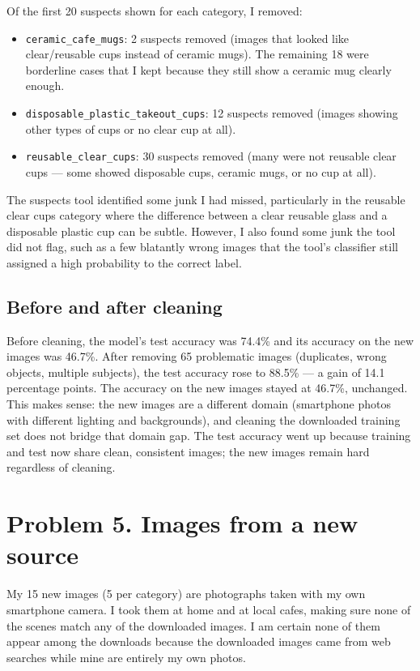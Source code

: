 \documentclass[11pt]{article}
\begin{document}
Of the first 20 suspects shown for each category, I removed:
\begin{itemize}
  \item \texttt{ceramic\_cafe\_mugs}: 2 suspects removed (images that looked like clear/reusable cups instead of ceramic mugs). The remaining 18 were borderline cases that I kept because they still show a ceramic mug clearly enough.
  \item \texttt{disposable\_plastic\_takeout\_cups}: 12 suspects removed (images showing other types of cups or no clear cup at all).
  \item \texttt{reusable\_clear\_cups}: 30 suspects removed (many were not reusable clear cups --- some showed disposable cups, ceramic mugs, or no cup at all).
\end{itemize}

The suspects tool identified some junk I had missed, particularly in the reusable clear cups category where the difference between a clear reusable glass and a disposable plastic cup can be subtle. However, I also found some junk the tool did not flag, such as a few blatantly wrong images that the tool's classifier still assigned a high probability to the correct label.

\subsection*{Before and after cleaning}

Before cleaning, the model's test accuracy was 74.4\% and its accuracy on the new images was 46.7\%. After removing 65 problematic images (duplicates, wrong objects, multiple subjects), the test accuracy rose to 88.5\% --- a gain of 14.1 percentage points. The accuracy on the new images stayed at 46.7\%, unchanged. This makes sense: the new images are a different domain (smartphone photos with different lighting and backgrounds), and cleaning the downloaded training set does not bridge that domain gap. The test accuracy went up because training and test now share clean, consistent images; the new images remain hard regardless of cleaning.

\section*{Problem 5. Images from a new source}

My 15 new images (5 per category) are photographs taken with my own smartphone camera. I took them at home and at local cafes, making sure none of the scenes match any of the downloaded images. I am certain none of them appear among the downloads because the downloaded images came from web searches while mine are entirely my own photos.
\end{document}
